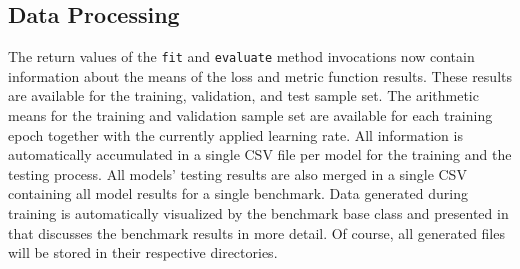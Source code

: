 \documentclass[draft,final]{vutinfth} %
\begin{document}
    \subsection{Data Processing}
    The return values of the \texttt{fit} and \texttt{evaluate} method invocations now contain information about the means of the loss and metric function results. These results are available for the training, validation, and test sample set.
    The arithmetic means for the training and validation sample set are available for each training epoch together with the currently applied learning rate.
    All information is automatically accumulated in a single CSV file per model for the training and the testing process.
    All models' testing results are also merged in a single CSV containing all model results for a single benchmark.
    Data generated during training is automatically visualized by the benchmark base class and presented in  that discusses the benchmark results in more detail.
    Of course, all generated files will be stored in their respective directories.
\end{document}
